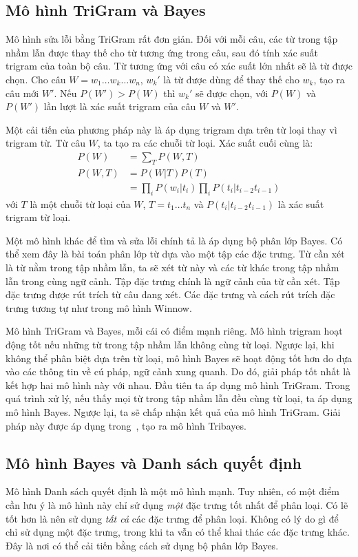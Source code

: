 \documentclass[a4paper,oneside,14pt]{extbook} %
\begin{document}
\subsection{Mô hình Tri\-Gram và Bayes}

Mô hình sửa lỗi bằng Tri\-Gram rất đơn giản. Đối với mỗi câu, các từ
trong tập nhầm lẫn được thay thế cho từ tương ứng trong câu, sau đó
tính xác suất tri\-gram của toàn bộ câu. Từ tương ứng với câu có xác
suất lớn nhất sẽ là từ được chọn. Cho câu $W =
w_1\ldots{} w_k\ldots{} w_n$, $w_k'$ là từ được dùng để thay thế cho
$w_k$, tạo ra câu mới $W'$. Nếu $P(W') > P(W)$ thì $w_k'$ sẽ được
chọn, với $P(W)$ và $P(W')$ lần lượt là xác suất tri\-gram của câu $W$
và $W'$.

Một cải tiến của phương pháp này là
áp dụng tri\-gram dựa trên từ loại thay vì tri\-gram từ. Từ câu $W$, ta
tạo ra các chuỗi từ loại. Xác suất cuối cùng là:
\begin{align*}
P(W)  &=\sum_T P(W,T)\\
P(W,T)&=P(W|T)P(T)\\
      &=\prod_i P(w_i|t_i)\prod_i P(t_i|t_{i-2}t_{i-1})
\end{align*}
với $T$ là một chuỗi từ loại của $W$, $T=t_1\ldots{} t_n$ và
$P(t_i|t_{i-2}t_{i-1})$ là xác suất tri\-gram từ loại.

Một mô hình khác để tìm và sửa lỗi chính tả là áp dụng bộ phân lớp
Bayes. Có thể xem đây là bài toán phân lớp từ dựa vào một tập các đặc
trưng. Từ cần xét là từ nằm trong tập nhầm lẫn, ta sẽ xét từ này và
các từ khác trong tập nhầm lẫn trong cùng ngữ cảnh. Tập đặc trưng
chính là ngữ cảnh của từ cần xét. Tập đặc trưng được rút trích từ câu
đang xét. Các đặc trưng và cách rút trích đặc trưng tương tự như trong
mô hình Winnow.

Mô hình Tri\-Gram và Bayes, mỗi cái có điểm mạnh riêng. Mô hình tri\-gram
hoạt động tốt nếu những từ trong tập nhầm lẫn không cùng từ
loại. Ngược lại, khi không thể phân biệt dựa trên từ loại, mô hình
Bayes sẽ hoạt động tốt hơn do dựa vào các thông tin về cú pháp, ngữ
cảnh xung quanh. Do đó, giải pháp tốt nhất là kết hợp hai mô hình này
với nhau. Đầu tiên ta áp dụng mô hình Tri\-Gram. Trong quá trình xử lý,
nếu thấy mọi từ trong tập nhầm lẫn đều cùng từ loại, ta áp dụng mô
hình Bayes. Ngược lại, ta sẽ chấp nhận kết quả của mô hình
Tri\-Gram. Giải pháp này được áp dụng trong~\cite{Golding96}, tạo ra mô
hình Tribayes.


\subsection{Mô hình Bayes và Danh sách quyết định}
Mô hình Danh sách quyết định là một mô hình mạnh. Tuy nhiên, có một
điểm cần lưu ý là mô hình này chỉ sử dụng {\em một} đặc trưng tốt nhất
để phân loại. Có lẽ tốt hơn là nên sử dụng {\em tất cả} các đặc trưng
để phân loại. Không có lý do gì để chỉ sử dụng một đặc trưng, trong
khi ta vẫn có thể khai thác các đặc trưng khác. Đây là nơi có thể cải
tiến bằng cách sử dụng bộ phân lớp Bayes.
\end{document}

